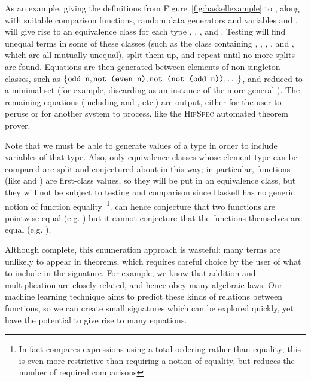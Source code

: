 As an example, giving the definitions from Figure~\ref{fig:haskellexample} to
\qspec{}, along with suitable comparison functions, random data generators and
variables  and , will give rise to an equivalence
class for each type , , ,  and
. Testing will find unequal terms in some of these classes
(such as the  class containing , , ,
,  and , which are all mutually unequal), split
them up, and repeat until no more splits are found. Equations are then generated
between elements of non-singleton classes, such as $\{\text{\texttt{odd n}},
\text{\texttt{not (even n)}}, \text{\texttt{not (not (odd n))}}, \ldots\}$, and reduced
to a minimal set (for example, discarding  as an
instance of the more general ). The remaining equations
(including  and , etc.) are
output, either for the user to peruse or for another system to process, like the
\textsc{HipSpec} automated theorem prover.

Note that we must be able to generate values of a type in order to include
variables of that type. Also, only equivalence classes whose element type can be
compared are split and conjectured about in this way; in particular, functions
(like  and ) are first-class values, so they will be put in an
equivalence class, but they will not be subject to testing and comparison since
Haskell has no generic notion of function equality~\footnote{In
  fact \qspec{} compares expressions using a total ordering rather than equality;
  this is even more restrictive than requiring a notion of equality, but reduces
  the number of required comparisons}. \qspec{} can hence conjecture that two
functions are pointwise-equal (e.g. ) but it cannot conjecture
that the functions themselves are equal (e.g. ).

Although complete, this enumeration approach is wasteful: many terms are
unlikely to appear in theorems, which requires careful choice by the user of
what to include in the signature. For example, we know that addition and
multiplication are closely related, and hence obey many algebraic laws. Our
machine learning technique aims to predict these kinds of relations between
functions, so we can create small signatures which can be explored quickly, yet
have the potential to give rise to many equations.

\iffalse TODO{2019-03-15} In fact, there are similarities between the way a TE
system like \qspec{} can generalise from checking \emph{particular} properties
to \emph{inventing} new ones, and the way counterexample finders like \qcheck{}
can generalise from testing \emph{particular} expressions to \emph{inventing}
expressions to test. One of our aims is to understand the implications of this
generalisation, the lessons that each can learn from the other's approach to
term generation, and the consequences for testing and QA in general.  \fi

